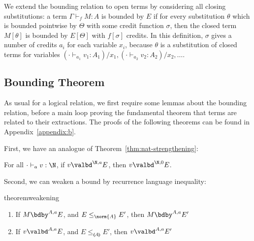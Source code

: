 We extend the bounding relation to open terms by considering all closing
substitutions: a term $\Gamma \vdash_f M : A$ is bounded by $E$ if for
every substitution $\theta$ which is bounded pointwise by $\Theta$ with
some credit function $\sigma$, then the closed term $M[\theta]$ is
bounded by $E[\Theta]$ with $f[\sigma]$ credits.  In this definition,
$\sigma$ gives a number of credits $a_i$ for each variable $x_i$,
because $\theta$ is a substitution of closed terms for variables $(\cdot
\vdash_{a_1} v_1 : A_1) / x_1, (\cdot \vdash_{a_2} v_2 : A_2) / x_2,
\ldots$.

\subsection{Bounding Theorem}

As usual for a logical relation, we first require some lemmas about the
bounding relation, before a main loop proving the fundamental theorem
that terms are related to their extractions.  The proofs of the following
theorems can be found
in Appendix~\ref{appendix:b}.%

First, we have an analogue of Theorem~\ref{thm:nat-strengthening}:

\begin{theorem}[$\N$-strengthening]
For all $\cdot \vdash_a v : \N$, if $v \valbd^{\N,a} E$, then $v \valbd^{\N,0} E$.
\end{theorem}

Second, we can weaken a bound by recurrence language inequality:

\begin{restatable}[Weakening]{theorem}{weakening} \hfill
\label{thm:weakening}
\begin{enumerate}
    \item If $M \bdby^{A,a} E$, and $E \leq_{\norm{A}} E'$, then $M \bdby^{A,a} E'$
    \item If $v \valbd^{A,a} E$, and $E \leq_{\llangle A \rrangle} E'$, then $v \valbd^{A,a} E'$
\end{enumerate}
\end{restatable}


